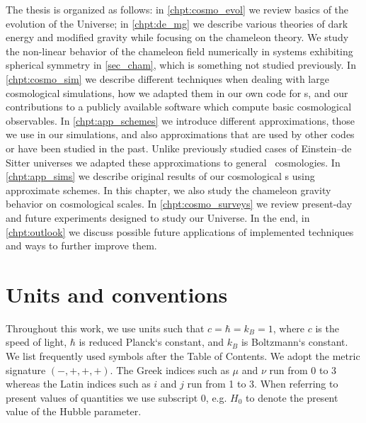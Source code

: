 The thesis is organized as follows: in \autoref{chpt:cosmo_evol} we review basics of the evolution of the Universe; in \autoref{chpt:de_mg} we describe various theories of dark energy and modified gravity while focusing on the chameleon theory. We study the non-linear behavior of the chameleon field numerically in systems exhibiting spherical symmetry in \autoref{sec_cham}, which is something not studied previously. In \autoref{chpt:cosmo_sim} we describe different techniques when dealing with large cosmological simulations, how we adapted them in our own code for \nbodysim s, and our contributions to a publicly available software  which compute basic cosmological observables. In \autoref{chpt:app_schemes} we introduce different approximations, those we use in our simulations, and also approximations that are used by other codes or have been studied in the past. Unlike previously studied cases of Einstein--de Sitter universes we adapted these approximations to general \LCDM\ cosmologies. In \autoref{chpt:app_sims} we describe original results of our cosmological \nbodysim s using approximate schemes. In this chapter, we also study the chameleon gravity behavior on cosmological scales. In \autoref{chpt:cosmo_surveys} we review present-day and future experiments designed to study our Universe. In the end, in \autoref{chpt:outlook} we discuss possible future applications of implemented techniques and ways to further improve them.

\section*{Units and conventions}
Throughout this work, we use units such that $c=\hbar=k_B=1$, where $c$ is the speed of light, $\hbar$ is reduced Planck`s constant, and $k_B$ is Boltzmann`s constant. We list frequently used symbols after the Table of Contents. We adopt the metric signature $(-, +, +, +)$. The Greek indices such as $\mu$ and $\nu$ run from 0 to 3 whereas the Latin indices such as $i$ and $j$ run from 1 to 3. When referring to present values of quantities we use subscript $0$, e.g. $H_0$ to denote the present value of the Hubble parameter.